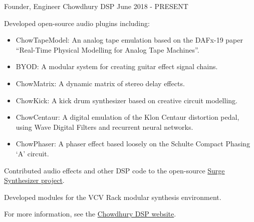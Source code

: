 

\begin{cventries}

  \cventry
    {Founder, Engineer} %
    {Chowdhury DSP} %
    {} %
    {June 2018 - PRESENT} %
    {
      \begin{cvitems} %
        \item {Developed open-source audio plugins including:}
        \begin{itemize}
            \item {ChowTapeModel: An analog tape emulation based on the DAFx-19 paper ``Real-Time Physical Modelling for Analog Tape Machines''.}
            \item {BYOD: A modular system for creating guitar effect signal chains.}
            \item {ChowMatrix: A dynamic matrix of stereo delay effects.}
            \item {ChowKick: A kick drum synthesizer based on creative circuit modelling.}
            \item {ChowCentaur: A digital emulation of the Klon Centaur distortion pedal, using Wave Digital Filters and recurrent neural networks.}
            \item {ChowPhaser: A phaser effect based loosely on the Schulte Compact Phasing `A' circuit.}
        \end{itemize}
        \item {Contributed audio effects and other DSP code to the open-source \href{https://surge-synthesizer.github.io}{Surge Synthesizer project}.}
        \item {Developed modules for the VCV Rack modular synthesis environment.}
        \item {For more information, see the \href{https://chowdsp.com}{Chowdhury DSP website}.}
      \end{cvitems}
    }


\end{cventries}
